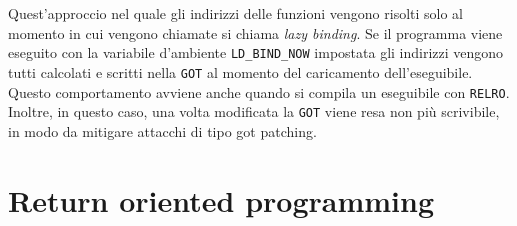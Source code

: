 Quest'approccio nel quale gli indirizzi delle funzioni vengono risolti
solo al momento in cui vengono chiamate si chiama \emph{lazy
  binding}. Se il programma viene eseguito con la variabile d'ambiente
\lstinline{LD_BIND_NOW} impostata gli indirizzi vengono tutti
calcolati e scritti nella \lstinline{GOT} al momento del caricamento
dell'eseguibile. Questo comportamento avviene anche quando si compila
un eseguibile con \lstinline{RELRO}. Inoltre, in questo caso, una
volta modificata la \lstinline{GOT} viene resa non più scrivibile, in
modo da mitigare attacchi di tipo got patching.


\section{Return oriented programming}

